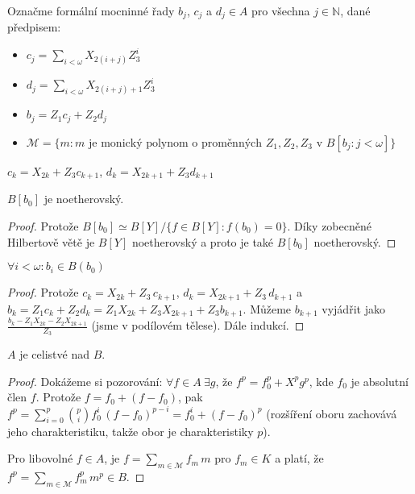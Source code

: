 \documentclass[11pt,a4paper]{article}
\newcommand\m[1]{\mathbb { #1 }} %
\newcommand\p[1]{\mathcal{ #1 }} %
\newcommand\N{\m N}
\theoremstyle{definition}
\theoremstyle{plain}
\begin{document}
 Označme formální mocninné řady $b_j$, $c_j$ a $d_j \in A$ pro všechna
$j \in \N$, dané předpisem:
\begin{itemize}
	\item $c_j = \sum_{i < \omega} X_{2(i + j)} Z^i_3$
	\item $d_j = \sum_{i < \omega} X_{2(i + j) + 1} Z^i_3$
	\item $b_j = Z_1c_j + Z_2d_j$
	\item $\p M = \{ m : m \text{ je monický polynom o proměnných } Z_1, Z_2,
	Z_3 \text{ v } B[b_j : j < \omega] \}$
\end{itemize}

\pozorovani $c_k = X_{2k} + Z_3 c_{k+1}$, $d_k = X_{2k+1} + Z_3 d_{k+1}$

\veta $B[b_0]$ je noetherovský.
\begin{proof}
	 Protože $B[b_0] \simeq B[Y] / \{ f \in B[Y] : f(b_0) = 0 \}$. Díky
	 zobecněné Hilbertově větě je $B[Y]$ noetherovský a proto je také $B[b_0]$
	 noetherovský.
\end{proof}

\lemma $\forall i < \omega\colon b_i \in B(b_0)$
\begin{proof}
	Protože $c_k = X_{2k} + Z_3\,c_{k+1}$, $d_k = X_{2k+1} + Z_3\,d_{k+1}$ a $b_k
	= Z_1 c_k + Z_2 d_k = Z_1 X_{2k} + Z_3 X_{2k + 1} + Z_3 b_{k + 1}$. Můžeme
	$b_{k+1}$ vyjádřit jako $\frac{b_k - Z_1 X_{2k} - Z_2 X_{2k+1}}{Z_3}$ (jsme
	v podílovém tělese). Dále indukcí.
\end{proof}

\lemma\label{celistvostA} $A$ je celistvé nad $B$.
\begin{proof}
	Dokážeme si pozorování: $\forall f \in A~\exists g$, že $f^p = f^p_0 + X^p
	g^p$, kde $f_0$ je absolutní člen $f$. Protože $f = f_0 + (f - f_0)$, pak
	$f^p = \sum_{i = 0}^p {p\choose i} f^i_0\,(f-f_0)^{p-i} = f^i_0 + (f-f_0)^p$
	(rozšíření oboru zachovává jeho charakteristiku, takže obor je
	charakteristiky $p$).

	Pro libovolné $f \in A$, je $f = \sum_{m \in \p M} f_m\,m$ pro $f_m \in K$
	a platí, že $f^p = \sum_{m\in\p M} f^p_m\,m^p \in B$.
\end{proof}
\end{document}
